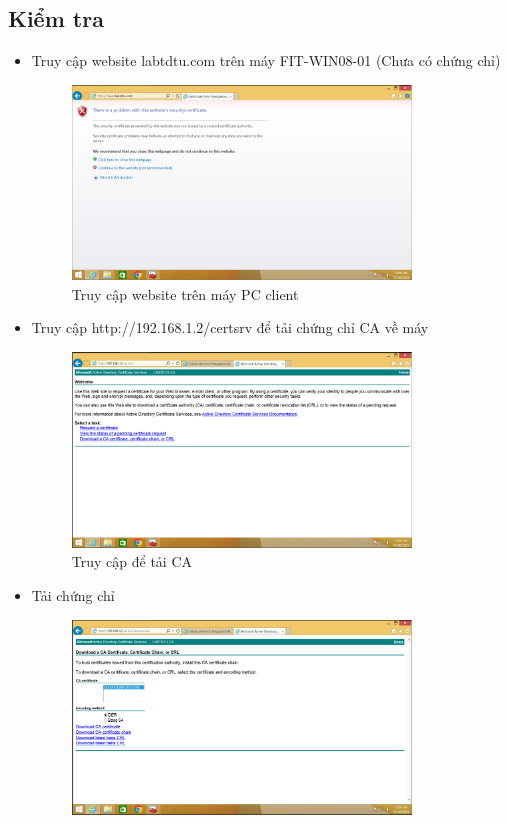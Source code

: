 \documentclass[13pt]{report}
\begin{document}
	\subsection{Kiểm tra}
	\begin{itemize}
		\item Truy cập website labtdtu.com trên máy FIT-WIN08-01 (Chưa có chứng chỉ)
		\begin{figure}[htp]
			\centering
			\includegraphics[width=0.85\textwidth]{image/PowerShell/Test/1.png}
			\caption{Truy cập website trên máy PC client}
		\end{figure}
		\newpage
		\item Truy cập http://192.168.1.2/certsrv để tải chứng chỉ CA về máy
		\begin{figure}[htp]
			\centering
			\includegraphics[width=0.85\textwidth]{image/PowerShell/Test/2.png}
			\caption{Truy cập để tải CA}
		\end{figure}
		\item Tải chứng chỉ 
		\begin{figure}[htp]
			\centering
			\includegraphics[width=0.85\textwidth]{image/PowerShell/Test/3.png}

\end{figure}
\end{itemize}
\end{document}
